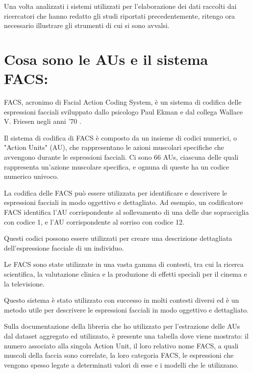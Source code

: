 Una volta analizzati i sistemi utilizzati per l’elaborazione dei dati raccolti dai ricercatori che hanno redatto gli studi riportati precedentemente, ritengo ora necessario illustrare gli strumenti di cui si sono avvalsi.


\section{Cosa sono le AUs e il sistema FACS:}
FACS, acronimo di Facial Action Coding System, è un sistema di codifica delle espressioni facciali sviluppato dallo psicologo Paul Ekman e dal collega Wallace V. Friesen negli anni '70 \cite{PyFeat}.

Il sistema di codifica di FACS è composto da un insieme di codici numerici, o "Action Units" (AU), che rappresentano le azioni muscolari specifiche che avvengono durante le espressioni facciali. Ci sono 66 AUs, ciascuna delle quali rappresenta un'azione muscolare specifica, e ognuna di queste ha un codice numerico univoco.

La codifica delle FACS può essere utilizzata per identificare e descrivere le espressioni facciali in modo oggettivo e dettagliato. Ad esempio, un codificatore FACS identifica l'AU corrispondente al sollevamento di una delle due sopracciglia con codice 1, e l'AU corrispondente al sorriso con codice 12. 

Questi codici possono essere utilizzati per creare una descrizione dettagliata dell'espressione facciale di un individuo.

Le FACS sono state utilizzate in una vasta gamma di contesti, tra cui la ricerca scientifica, la valutazione clinica e la produzione di effetti speciali per il cinema e la televisione. 

Questo sistema è stato utilizzato con successo in molti contesti diversi ed è un metodo utile per descrivere le espressioni facciali in modo oggettivo e dettagliato. 

Sulla documentazione della libreria che ho utilizzato per l’estrazione delle AUs dal dataset aggregato ed utilizzato, è presente una tabella dove viene mostrato: il numero associato alla singola Action Unit, il loro relativo nome FACS, a quali muscoli della faccia sono correlate, la loro categoria FACS, le espressioni che vengono spesso legate a determinati valori di esse e i modelli che le utilizzano.

